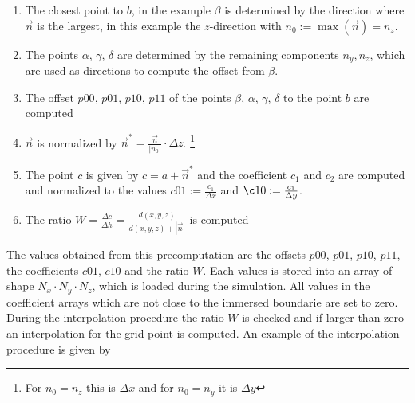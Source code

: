 \begin{enumerate}
    \item The closest point to $b$, in the example  $\beta$ is determined by the direction where $\vec{n}$ is the largest, in this example
          the $z$-direction with $n_0 := \max(\vec{n}) = n_z$.

    \item The points $\alpha$, $\gamma$, $\delta$ are determined by the remaining components ${n_y, n_z}$, which are used as directions to
            compute the offset from $\beta$.

    \item The offset $p00$, $p01$, $p10$, $p11$ of the points $\beta$, $\alpha$, $\gamma$, $\delta$ to the point $b$ are computed

    \item $\vec{n}$ is normalized by $\vec{n}^* = \frac{\vec{n}}{|n_0|}\cdot \Delta z$.
            \footnote{For $n_0=n_z$ this is $\Delta x$ and for $n_0=n_y$ it is $\Delta y$}

    \item The point $c$ is given by $c = a + \vec{n}^*$ and the coefficient $c_1$ and $c_2$ are computed and normalized to the values
           $c01 := \frac{c_1}{\Delta x}$ and $\c10 := \frac{c_1}{\Delta y}$.
    \item The ratio $W=\frac{\Delta c}{\Delta h} = \frac{d(x, y, z)}{d(x, y, z) + |\vec{n}| }$ is computed
\end{enumerate}

The values obtained from this precomputation are the offsets  $p00$, $p01$, $p10$, $p11$, the coefficients $c01$, $c10$ and
the ratio $W$. Each values is stored into an array of shape $N_x \cdot N_y \cdot N_z$, which is loaded during the simulation.
All values in the coefficient arrays which are not close to the immersed boundarie are set to zero.
During the interpolation procedure the ratio $W$ is checked and if larger than zero an interpolation for the grid point is computed.
An example of the interpolation procedure is given by

